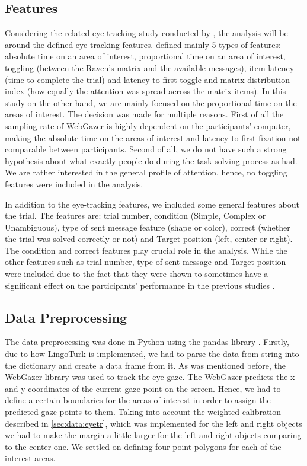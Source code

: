 \subsection{Features}
\label{sec:analysis:features}
Considering the related eye-tracking study conducted by \cite{Vigneau_2006}, the analysis will be around the defined eye-tracking features. \cite{Vigneau_2006} defined mainly 5 types of features: absolute time on an area of interest, proportional time on an area of interest, toggling (between the Raven's matrix and the available messages), item latency (time to complete the trial) and latency to first toggle and matrix distribution index (how equally the attention was spread across the matrix items). In this study on the other hand, we are mainly focused on the proportional time on the areas of interest. The decision was made for multiple reasons. First of all the sampling rate of WebGazer is highly dependent on the participants' computer, making the absolute time on the areas of interest and latency to first fixation not comparable between participants. Second of all, we do not have such a strong hypothesis about what exactly people do during the task solving process as \cite{Vigneau_2006} had. We are rather interested in the general profile of attention, hence, no toggling features were included in the analysis. 

In addition to the eye-tracking features, we included some general features about the trial. The features are: trial number, condition (Simple, Complex or Unambiguous), type of sent message feature (shape or color), correct (whether the trial was solved correctly or not) and Target position (left, center or right). The condition and correct features play crucial role in the analysis. While the other features such as trial number, type of sent message and Target position were included due to the fact that they were shown to sometimes have a significant effect on the participants' performance in the previous studies \citep{Mayn_2023, Mayn_2025}.

\subsection{Data Preprocessing}
\label{sec:analysis:preprocessing}
The data preprocessing was done in Python using the pandas library \citep{pandas}. Firstly, due to how LingoTurk \citep{lingoturk} is implemented, we had to parse the data from string into the dictionary and create a data frame from it. As was mentioned before, the WebGazer \citep{webgazer} library was used to track the eye gaze. The WebGazer predicts the x and y coordinates of the current gaze point on the screen. Hence, we had to define a certain boundaries for the areas of interest in order to assign the predicted gaze points to them. Taking into account the weighted calibration described in \autoref{sec:data:eyetr}, which was implemented for the left and right objects we had to make the margin a little larger for the left and right objects comparing to the center one. We settled on defining four point polygons for each of the interest areas. 

